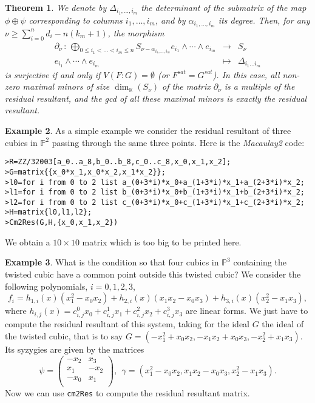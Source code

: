 \documentclass[10pt]{amsart}
\theoremstyle{plain}
\newtheorem{thm}{Theorem}[section]
\theoremstyle{definition}
\newtheorem{exmp}[thm]{Example}
\def\PP{{\mathbb{P}}}
\def\KK{{\mathbb{K}}}
\begin{document}
\begin{thm} We denote by $\Delta_{i_1,\ldots,i_m}$ the determinant 
  of the submatrix of the map $\phi\oplus\psi$ corresponding to
  columns $i_1,\ldots,i_m$, and by $\alpha_{i_1,\ldots,i_m}$ its
  degree. Then, for any $\nu \geq \sum_{i=0}^{n}d_i-n(k_m+1)$, the
  morphism
\begin{eqnarray*}
 \partial_\nu \, : \,  \bigoplus_{0 \leq i_{1} < \ldots < i_{m} \leq n }
S_{\nu-\alpha_{i_1,\ldots,i_m}}e_{i_1}\wedge \cdots
\wedge e_{i_m}  &  \longrightarrow  & S_{\nu} \\
e_{i_1}\wedge \cdots \wedge e_{i_m}  & \mapsto & 
\Delta_{i_1\ldots i_m}
\end{eqnarray*}
is surjective if and only if $V(F:G)=\emptyset$ (or
$F^{sat}=G^{sat}$).  In this case, all non-zero maximal minors of size
$\dim_\KK(S_\nu)$ of the matrix $\partial_\nu $ is a multiple of
the residual resultant, and the gcd of all these maximal minors is
exactly the residual resultant.
\end{thm}

\begin{exmp}
 As a simple example we consider the residual resultant of three cubics in $\PP^2$ passing through the same three points. Here is the \textit{Macaulay2} code:
\begin{verbatim}
>R=ZZ/32003[a_0..a_8,b_0..b_8,c_0..c_8,x_0,x_1,x_2]; 
>G=matrix{{x_0*x_1,x_0*x_2,x_1*x_2}}; 
>l0=for i from 0 to 2 list a_(0+3*i)*x_0+a_(1+3*i)*x_1+a_(2+3*i)*x_2;  
>l1=for i from 0 to 2 list b_(0+3*i)*x_0+b_(1+3*i)*x_1+b_(2+3*i)*x_2; 
>l2=for i from 0 to 2 list c_(0+3*i)*x_0+c_(1+3*i)*x_1+c_(2+3*i)*x_2; 
>H=matrix{l0,l1,l2}; 
>Cm2Res(G,H,{x_0,x_1,x_2})
\end{verbatim}
We obtain a $10\times 10$ matrix which is too big to be printed here.
\end{exmp}

\begin{exmp}
 What is the condition so that four cubics in $\PP^3$ containing the twisted cubic have a common point outside this twisted cubic? We consider the following polynomials, $i=0,1,2,3$, 
$$f_i=h_{1,i}(x)(x_1^2-x_0x_2)+h_{2,i}(x)(x_1x_2-x_0x_3)+h_{3,i}(x)(x_2^2-x_1x_3),$$
where
$h_{i,j}(x)=c_{i,j}^0x_0+c_{i,j}^1x_1+c_{i,j}^2x_2+c_{i,j}^3x_3$
are linear forms. We just have to compute the residual resultant of this system, taking for the ideal $G$ the ideal of the twisted cubic, that is to say $G=(-{{x}}_{1}^{2}+{{x}}_{0} {{x}}_{{2}},
-{{x}}_{1} {{x}}_{{2}}+{{x}}_{0} {{x}}_{{3}},
-{{x}}_{{2}}^{2}+{{x}}_{1} {{x}}_{{3}})$. Its syzygies are given by the matrices  
$$\psi=\left(\begin{array}{cc}
        -x_2 & x_3 \\
        x_1 & -x_2 \\
        -x_0 & x_1 \\
        \end{array}\right),\ \ \gamma=({{x}}_{1}^{2}-{{x}}_{0}
      {{x}}_{{2}},
      {{x}}_{1} {{x}}_{{2}}-{{x}}_{0} {{x}}_{{3}},
{{x}}_{{2}}^{2}-{{x}}_{1} {{x}}_{{3}}).$$
Now we can use {\tt cm2Res} to compute the residual resultant matrix.
\end{exmp}
\end{document}
